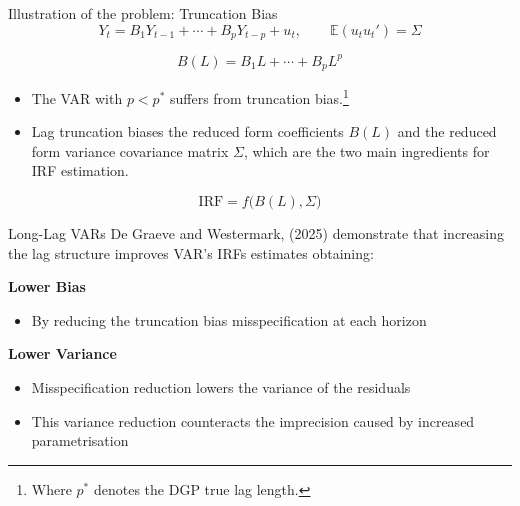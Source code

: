 \documentclass[11pt]{beamer}
\begin{document}

\begin{frame}{Illustration of the problem: Truncation Bias}\label{slide:truncation_bias}
    \begin{equation}
        Y_t = B_1Y_{t-1} + \cdots + B_pY_{t-p} + u_t, \qquad \mathbb{E}(u_t u_t') = \Sigma
    \end{equation}

    \begin{equation}
        B(L) = B_1L + \cdots + B_pL^p
    \end{equation}

    \begin{itemize}
        \item The VAR with $p < p^{*}$ suffers from truncation bias.\footnote{Where $p^{*}$ denotes the DGP true lag length.}

        \item Lag truncation biases the reduced form coefficients $B(L)$ and the reduced form variance covariance matrix $\Sigma$, which are the two main ingredients for IRF estimation.
    \end{itemize}

    \begin{equation}
        \mathrm{IRF} = f\bigl(B(L),\Sigma\bigr)
    \end{equation}


\end{frame}


\begin{frame}{Long-Lag VARs}
    De Graeve and Westermark, (2025) demonstrate that increasing the lag structure improves VAR's IRFs estimates obtaining:
    \pause
    \vspace{0.4cm}
    
    \textbf{Lower Bias}
    \begin{itemize}
        \item By reducing the truncation bias misspecification at each horizon
    \end{itemize}
    \pause

    \vspace{0.4cm}
    \textbf{Lower Variance}
    \begin{itemize}
        \item Misspecification reduction lowers the variance of the residuals
        \item This variance reduction counteracts the imprecision caused by increased parametrisation
    \end{itemize}
\end{frame}
\end{document}
